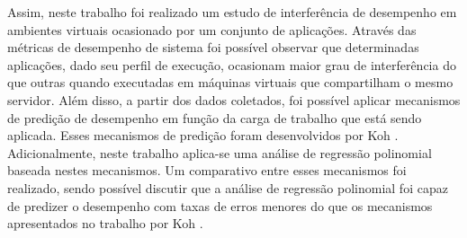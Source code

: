 Assim, neste trabalho foi realizado um estudo de interferência de desempenho em ambientes virtuais ocasionado por um conjunto de aplicações. Através das métricas de desempenho de sistema foi possível observar que determinadas aplicações, dado seu perfil de execução, ocasionam maior grau de interferência do que outras quando executadas em máquinas virtuais que compartilham o mesmo servidor. Além disso, a partir dos dados coletados, foi possível aplicar mecanismos de predição de desempenho em função da carga de trabalho que está sendo aplicada. Esses mecanismos de predição foram desenvolvidos por Koh \cite{koh2007}. Adicionalmente, neste trabalho aplica-se uma análise de regressão polinomial baseada nestes mecanismos. Um comparativo entre esses mecanismos foi realizado, sendo possível discutir que a análise de regressão polinomial foi capaz de predizer o desempenho com taxas de erros menores do que os mecanismos apresentados no trabalho por Koh \cite{koh2007}.  

